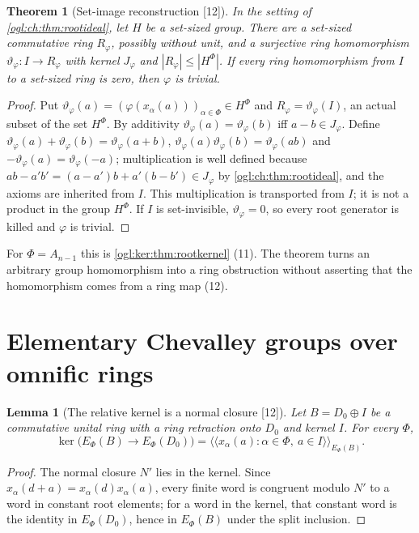 \documentclass[11pt,oneside]{article}
\numberwithin{equation}{section}
\newtheorem{theorem}{Theorem}[section]
\newtheorem{lemma}[lemma]{Lemma}
\theoremstyle{definition}
\theoremstyle{remark}
\newcommand{\src}[1]{\textup{\textsf{\small[#1]}}}
\begin{document}
\begin{theorem}[Set-image reconstruction \src{12}]\label{ogl:ch:thm:reconstruction}
In the setting of \cref{ogl:ch:thm:rootideal}, let $H$ be a set-sized group.
There are a set-sized commutative ring $R_\varphi$, possibly without unit, and a
surjective ring homomorphism $\vartheta_\varphi:I\to R_\varphi$ with kernel
$J_\varphi$ and $|R_\varphi|\le|H^\Phi|$. If every ring homomorphism from $I$ to
a set-sized ring is zero, then $\varphi$ is trivial.
\end{theorem}
\begin{proof}
Put $\vartheta_\varphi(a)=(\varphi(x_\alpha(a)))_{\alpha\in\Phi}\in H^\Phi$ and
$R_\varphi=\vartheta_\varphi(I)$, an actual subset of the set $H^\Phi$. By
additivity $\vartheta_\varphi(a)=\vartheta_\varphi(b)$ iff $a-b\in J_\varphi$.
Define $\vartheta_\varphi(a)+\vartheta_\varphi(b)=\vartheta_\varphi(a+b)$,
$\vartheta_\varphi(a)\vartheta_\varphi(b)=\vartheta_\varphi(ab)$ and
$-\vartheta_\varphi(a)=\vartheta_\varphi(-a)$; multiplication is well defined
because $ab-a'b'=(a-a')b+a'(b-b')\in J_\varphi$ by
\cref{ogl:ch:thm:rootideal}, and the axioms are inherited from $I$. This
multiplication is transported from $I$; it is not a product in the group
$H^\Phi$. If $I$ is set-invisible, $\vartheta_\varphi=0$, so every root
generator is killed and $\varphi$ is trivial.
\end{proof}

For $\Phi=A_{n-1}$ this is \cref{ogl:ker:thm:rootkernel} (11). The theorem turns
an arbitrary group homomorphism into a ring obstruction without asserting that
the homomorphism comes from a ring map (12).

\section{Elementary Chevalley groups over omnific rings}\label{ogl:ch:sec:elementary}

\begin{lemma}[The relative kernel is a normal closure \src{12}]\label{ogl:ch:lem:normalclosure}
Let $B=D_0\oplus I$ be a commutative unital ring with a ring retraction onto
$D_0$ and kernel $I$. For every $\Phi$,
\[
 \ker\bigl(E_\Phi(B)\to E_\Phi(D_0)\bigr)
 =\bigl\langle\!\bigl\langle x_\alpha(a):\alpha\in\Phi,\ a\in I\bigr\rangle\!\bigr\rangle_{E_\Phi(B)} .
\]
\end{lemma}
\begin{proof}
The normal closure $N'$ lies in the kernel. Since $x_\alpha(d+a)=x_\alpha(d)x_\alpha(a)$,
every finite word is congruent modulo $N'$ to a word in constant root elements;
for a word in the kernel, that constant word is the identity in $E_\Phi(D_0)$,
hence in $E_\Phi(B)$ under the split inclusion.
\end{proof}
\end{document}
